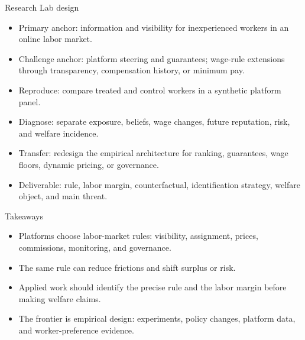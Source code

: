 \documentclass[aspectratio=169,11pt]{beamer}
\begin{document}
\begin{frame}{Research Lab design}
\begin{itemize}
    \item Primary anchor: information and visibility for inexperienced workers in an online labor market.
    \item Challenge anchor: platform steering and guarantees; wage-rule extensions through transparency, compensation history, or minimum pay.
    \item Reproduce: compare treated and control workers in a synthetic platform panel.
    \item Diagnose: separate exposure, beliefs, wage changes, future reputation, risk, and welfare incidence.
    \item Transfer: redesign the empirical architecture for ranking, guarantees, wage floors, dynamic pricing, or governance.
    \item Deliverable: rule, labor margin, counterfactual, identification strategy, welfare object, and main threat.
\end{itemize}
\end{frame}

\begin{frame}{Takeaways}
\begin{itemize}
    \item Platforms choose labor-market rules: visibility, assignment, prices, commissions, monitoring, and governance.
    \item The same rule can reduce frictions and shift surplus or risk.
    \item Applied work should identify the precise rule and the labor margin before making welfare claims.
    \item The frontier is empirical design: experiments, policy changes, platform data, and worker-preference evidence.
\end{itemize}
\end{frame}
\end{document}
